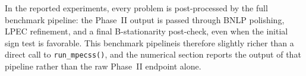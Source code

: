 In the reported experiments, every problem is post-processed by the full
benchmark pipeline: the Phase~II output is passed through BNLP
polishing, LPEC refinement, and a final B-stationarity post-check,
even when the initial sign test is favorable. This benchmark pipelineis
therefore slightly richer than a direct call to \texttt{run\_mpecss()},
and the numerical section reports the output of that pipeline rather than
the raw Phase~II endpoint alone.


